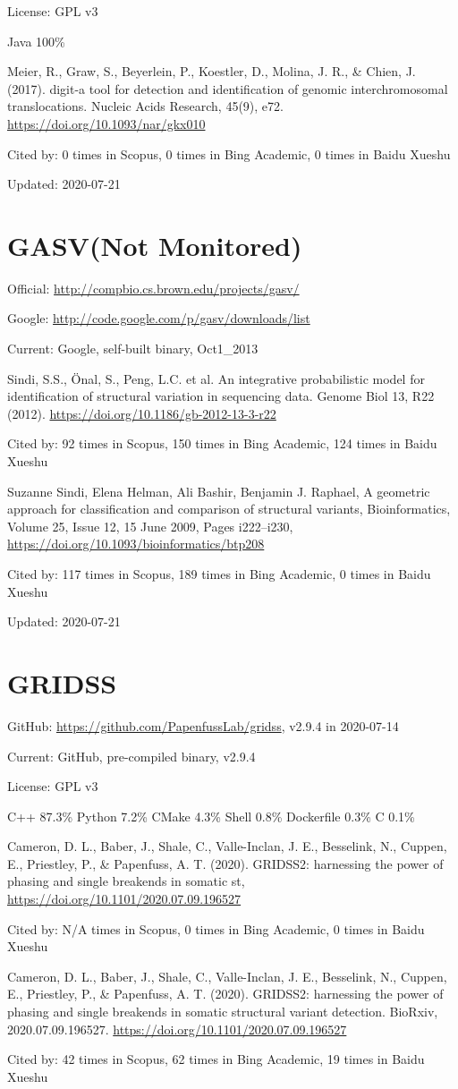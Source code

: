 \documentclass[]{article}
\newcommand{\nm}{{\color{red}(Not Monitored)}}
\newcommand{\cb}[3]{\par Cited by: {\color{blue}\Huge #1} times in Scopus, {\color{blue}\Huge #2} times in Bing Academic, {\color{blue}\Huge #3} times in Baidu Xueshu}
\begin{document}
License: GPL v3

Java 100\%

Meier, R., Graw, S., Beyerlein, P., Koestler, D., Molina, J. R., \& Chien, J. (2017). digit-a tool for detection and identification of genomic interchromosomal translocations. Nucleic Acids Research, 45(9), e72. \url{https://doi.org/10.1093/nar/gkx010}\cb{0}{0}{0}

Updated: 2020-07-21

\section{GASV\nm}

Official: \url{http://compbio.cs.brown.edu/projects/gasv/}

Google: \url{http://code.google.com/p/gasv/downloads/list}

Current: Google, self-built binary, Oct1\_2013

Sindi, S.S., Önal, S., Peng, L.C. et al. An integrative probabilistic model for identification of structural variation in sequencing data. Genome Biol 13, R22 (2012). \url{https://doi.org/10.1186/gb-2012-13-3-r22}\cb{92}{150}{124}

Suzanne Sindi, Elena Helman, Ali Bashir, Benjamin J. Raphael, A geometric approach for classification and comparison of structural variants, Bioinformatics, Volume 25, Issue 12, 15 June 2009, Pages i222–i230, \url{https://doi.org/10.1093/bioinformatics/btp208}\cb{117}{189}{0}

Updated: 2020-07-21

\section{GRIDSS}

GitHub: \url{https://github.com/PapenfussLab/gridss}, v2.9.4 in 2020-07-14

Current: GitHub, pre-compiled binary, v2.9.4

License: GPL v3

C++ 87.3\% Python 7.2\% CMake 4.3\% Shell 0.8\% Dockerfile 0.3\% C 0.1\%

Cameron, D. L., Baber, J., Shale, C., Valle-Inclan, J. E., Besselink, N., Cuppen, E., Priestley, P., \& Papenfuss, A. T. (2020). GRIDSS2: harnessing the power of phasing and single breakends in somatic st, \url{https://doi.org/10.1101/2020.07.09.196527}\cb{N/A}{0}{0}

Cameron, D. L., Baber, J., Shale, C., Valle-Inclan, J. E., Besselink, N., Cuppen, E., Priestley, P., \& Papenfuss, A. T. (2020). GRIDSS2: harnessing the power of phasing and single breakends in somatic structural variant detection. BioRxiv, 2020.07.09.196527. \url{https://doi.org/10.1101/2020.07.09.196527} \cb{42}{62}{19}
\end{document}
